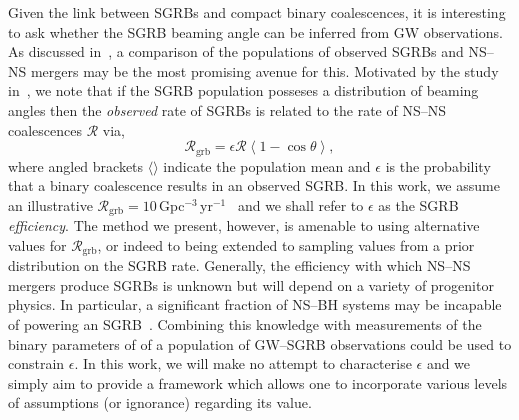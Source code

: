 \documentclass[twocolumn]{aastex61}
\newcommand{\grbrate}{{{\mathcal R}_{\mathrm{grb}}}}
\newcommand{\cbcrate}{{{\mathcal R}}}
\newcommand{\BNS}{\ac{NS}--\ac{NS}\xspace}
\newcommand{\NSBH}{\ac{NS}--\ac{BH}\xspace}
\newcommand{\JOINT}{\ac{GW}--\ac{SGRB}\xspace}
\begin{document}
Given the link between \acp{SGRB} and compact binary coalescences, it is
interesting to ask whether the \ac{SGRB} beaming angle can be inferred from
\ac{GW} observations. As discussed in~\cite{Clark:2014jpa}, a comparison of
the populations of observed \acp{SGRB} and \BNS mergers may be the most
promising avenue for this. Motivated by the study in~\cite{Chen:2012qh},
we note that if the \ac{SGRB} population posseses a distribution of beaming
angles then the \emph{observed} rate of \acp{SGRB} is related to the rate of
\BNS coalescences $\cbcrate$ via,
%
\begin{equation}\label{eq:rate2angle}
    \grbrate = \epsilon\cbcrate \left \langle 1-\cos \theta \right \rangle,
\end{equation}
%
where angled brackets $\langle \rangle$ indicate the population mean
and $\epsilon$ is the probability that a binary coalescence results in
an observed \ac{SGRB}.  In this work, we assume an illustrative
$\grbrate=10$\,Gpc$^{-3}$\,yr$^{-1}$~\cite{Nakar:2007yr,Dietz:2010eh}
and we shall refer to $\epsilon$ as the \ac{SGRB}
\emph{efficiency}. The method we present, however, is amenable to
using alternative values for $\grbrate$, or indeed to being extended to
sampling values from a prior distribution on the \ac{SGRB} rate. Generally,
the efficiency with which \BNS mergers produce \acp{SGRB} is unknown
but will depend on a variety of progenitor physics.  In particular, a
significant fraction of \NSBH systems may be incapable of powering an
\ac{SGRB}~\cite{Pannarale:2014rea}.  Combining this knowledge with
measurements of the binary parameters of of a population of \JOINT
observations could be used to constrain $\epsilon$.  In this work, we
will make no attempt to characterise $\epsilon$ and we simply aim to
provide a framework which allows one to incorporate various levels of
assumptions (or ignorance) regarding its value.
\end{document}
